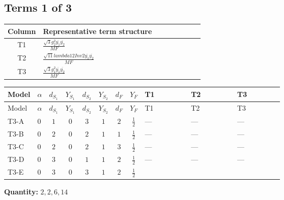 \documentclass[8pt]{article}
\begin{document}
\begin{landscape}
\subsection*{Terms 1 of 3}
\begin{center}
\begin{tabular}{@{}c >{\raggedright\arraybackslash}p{0.82\linewidth}@{}}
\toprule
Column & Representative term structure \\
\midrule
T1 & \(\displaystyle \frac{\sqrt{3} g_{2}^{2} \overline{y_{1}} \overline{y_{2}}}{MF}\) \\
\midrule
T2 & \(\displaystyle \frac{\sqrt{11} lambda12Inv2 \overline{y_{1}} \overline{y_{2}}}{MF}\) \\
\midrule
T3 & \(\displaystyle \frac{\sqrt{3} g_{1}^{2} \overline{y_{1}} \overline{y_{2}}}{MF}\) \\
\midrule
\bottomrule
\end{tabular}
\end{center}
\smallskip
\tiny
\begin{longtable}{@{}llcccccc >{\raggedright\arraybackslash}p{0.21\linewidth} >{\raggedright\arraybackslash}p{0.21\linewidth} >{\raggedright\arraybackslash}p{0.21\linewidth}@{}}
\toprule
Model & $\alpha$ & $d_{S_1}$ & $Y_{S_1}$ & $d_{S_2}$ & $Y_{S_2}$ & $d_F$ & $Y_F$ & T1 & T2 & T3 \\
\midrule
\endfirsthead
\toprule
Model & $\alpha$ & $d_{S_1}$ & $Y_{S_1}$ & $d_{S_2}$ & $Y_{S_2}$ & $d_F$ & $Y_F$ & T1 & T2 & T3 \\
\midrule
\endhead
T3-A & $0$ & $1$ & $0$ & $3$ & $1$ & $2$ & $\frac{1}{2}$ & --- & --- & --- \\
\midrule
T3-B & $0$ & $2$ & $0$ & $2$ & $1$ & $1$ & $\frac{1}{2}$ & --- & --- & --- \\
\midrule
T3-C & $0$ & $2$ & $0$ & $2$ & $1$ & $3$ & $\frac{1}{2}$ & --- & --- & --- \\
\midrule
T3-D & $0$ & $3$ & $0$ & $1$ & $1$ & $2$ & $\frac{1}{2}$ & --- & --- & --- \\
\midrule
T3-E & $0$ & $3$ & $0$ & $3$ & $1$ & $2$ & $\frac{1}{2}$ & \scriptsize\adjustbox{max width=\linewidth}{$\begin{gathered} - \frac{49 \sqrt{3} g_{2}^{2} \overline{y_{1}} \overline{y_{2}}}{24 MF}\end{gathered}$} & \scriptsize\adjustbox{max width=\linewidth}{$\begin{gathered} - \frac{3 \sqrt{11} lambda12Inv2 \overline{y_{1}} \overline{y_{2}}}{22 MF}\end{gathered}$} & \scriptsize\adjustbox{max width=\linewidth}{$\begin{gathered} - \frac{\sqrt{3} g_{1}^{2} \overline{y_{1}} \overline{y_{2}}}{8 MF}\end{gathered}$} \\
\midrule
\bottomrule
\end{longtable}
\clearpage
\noindent\textbf{Quantity: }$\mathrm{2,2,6,14}$\par\smallskip

\end{landscape}
\end{document}
